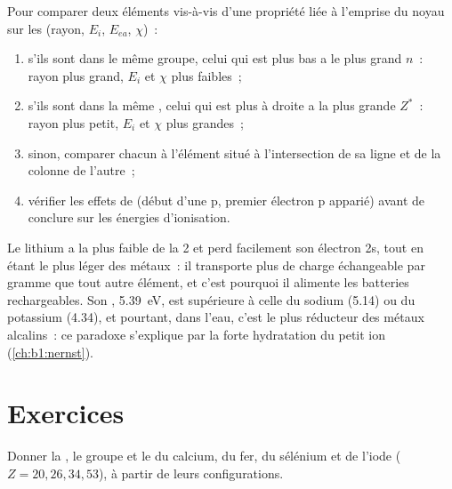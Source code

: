 \begin{method}\label{met:b1:periodicity:predict}
Pour comparer deux éléments vis-à-vis d'une propriété liée à l'emprise
du noyau sur les  (rayon, $E_i$, $E_{ea}$, $\chi$)~:
\begin{enumerate}
  \item s'ils sont dans le même groupe, celui qui est plus bas a le plus
        grand $n$~: rayon plus grand, $E_i$ et $\chi$ plus faibles~;
  \item s'ils sont dans la même , celui qui est plus à droite a la
        plus grande $Z^{*}$~: rayon plus petit, $E_i$ et $\chi$ plus
        grandes~;
  \item sinon, comparer chacun à l'élément situé à l'intersection de sa
        ligne et de la colonne de l'autre~;
  \item vérifier les effets de  (début d'une  p,
        premier électron p apparié) avant de conclure sur les énergies
        d'ionisation.
\end{enumerate}
\end{method}

\begin{example}\label{ex:b1:periodicity:lithium}
Le lithium a la plus faible  de la  2 et perd
facilement son électron 2s, tout en étant le plus léger des métaux~: il
transporte plus de charge échangeable par gramme que tout autre élément,
et c'est pourquoi il alimente les batteries rechargeables. Son , \qty{5.39}{eV}, est supérieure à celle du sodium
(5.14) ou du potassium (4.34), et pourtant, dans l'eau, c'est le plus
réducteur des métaux alcalins~: ce paradoxe s'explique par la forte
hydratation du petit ion  (\cref{ch:b1:nernst}).
\end{example}

\section{Exercices}

\begin{exercise}[$\star$]\label{exo:b1:periodicity:1}
Donner la , le groupe et le  du calcium, du fer, du sélénium
et de l'iode ($Z = 20, 26, 34, 53$), à partir de leurs configurations.
\end{exercise}

